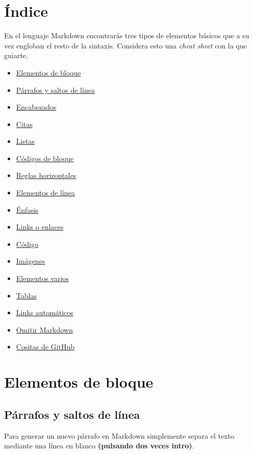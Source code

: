\chapter{Índice}

En el lenguaje Markdown encontrarás tres tipos de elementos básicos que a su vez engloban el resto de la sintaxis. Considera esto una \emph{cheat sheet} con la que guiarte.

\begin{itemize}
\item \href{#elementos\itemde\itembloque}{Elementos de bloque}
\item \href{#párrafos\itemy\itemsaltos\itemde\itemlínea}{Párrafos y saltos de línea}
\item \href{#encabezados}{Encabezados}
\item \href{#citas}{Citas}
\item \href{#listas}{Listas}
\item \href{#códigos\itemde\itembloque}{Códigos de bloque}
\item \href{#reglas\itemhorizontales}{Reglas horizontales}
\item \href{#elementos\itemde\itemlínea}{Elementos de línea}
\item \href{#Énfasis\itemnegritas\itemy\itemcursivas}{Énfasis}
\item \href{#links\itemo\itemenlaces}{Links o enlaces}
\item \href{#código}{Código}
\item \href{#imágenes}{Imágenes}
\item \href{#elementos\itemvarios}{Elementos varios}
\item \href{#tablas}{Tablas}
\item \href{#links\itemautomáticos\item1}{Links automáticos}
\item \href{#omitir\itemmarkdown}{Omitir Markdown}
\item \href{#cositas\itemde\itemgithub}{Cositas de GitHub}
\end{itemize}

\chapter{Elementos de bloque}

\section{Párrafos y saltos de línea}

Para generar un nuevo párrafo en Markdown simplemente separa el texto mediante una línea en blanco \textbf{(pulsando dos veces intro)}.

